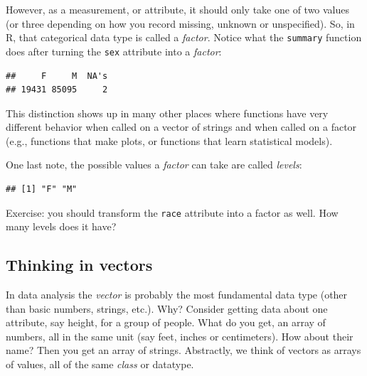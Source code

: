 \documentclass[]{article}
\newenvironment{Shaded}{\begin{snugshade}}{\end{snugshade}}
\newcommand{\KeywordTok}[1]{\textcolor[rgb]{0.13,0.29,0.53}{\textbf{{#1}}}}
\newcommand{\StringTok}[1]{\textcolor[rgb]{0.31,0.60,0.02}{{#1}}}
\newcommand{\NormalTok}[1]{{#1}}
\theoremstyle{definition}
\theoremstyle{definition}
\theoremstyle{remark}
\begin{document}
However, as a measurement, or attribute, it should only take one of two
values (or three depending on how you record missing, unknown or
unspecified). So, in R, that categorical data type is called a
\emph{factor}. Notice what the \texttt{summary} function does after
turning the \texttt{sex} attribute into a \emph{factor}:

\begin{Shaded}
\end{Shaded}

\begin{verbatim}
##     F     M  NA's 
## 19431 85095     2
\end{verbatim}

This distinction shows up in many other places where functions have very
different behavior when called on a vector of strings and when called on
a factor (e.g., functions that make plots, or functions that learn
statistical models).

One last note, the possible values a \emph{factor} can take are called
\emph{levels}:

\begin{Shaded}
\end{Shaded}

\begin{verbatim}
## [1] "F" "M"
\end{verbatim}

Exercise: you should transform the \texttt{race} attribute into a factor
as well. How many levels does it have?

\subsection{Thinking in vectors}\label{thinking-in-vectors}

In data analysis the \emph{vector} is probably the most fundamental data
type (other than basic numbers, strings, etc.). Why? Consider getting
data about one attribute, say height, for a group of people. What do you
get, an array of numbers, all in the same unit (say feet, inches or
centimeters). How about their name? Then you get an array of strings.
Abstractly, we think of vectors as arrays of values, all of the same
\emph{class} or datatype.
\end{document}
